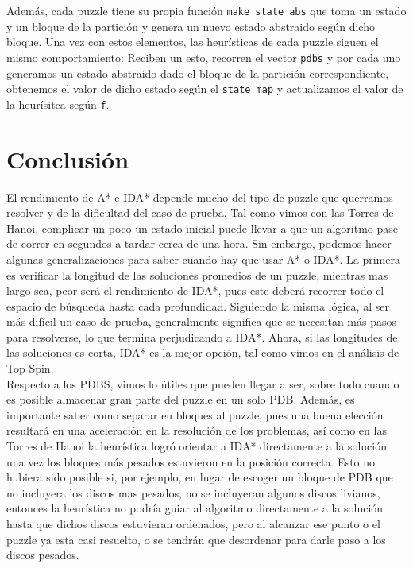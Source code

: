 \documentclass[a4paper,10pt]{article}
\begin{document}
    Adem\'as, cada puzzle tiene su propia funci\'on \verb|make_state_abs| que toma un 
    estado y un bloque de la partici\'on y genera un nuevo estado abstraido seg\'un 
    dicho bloque. Una vez con estos elementos, las heur\'isticas de cada puzzle siguen 
    el mismo comportamiento: Reciben un esto, recorren el vector \verb|pdbs| y por cada 
    uno generamos un estado abstraido dado el bloque de la partici\'on correspondiente, 
    obtenemos el valor de dicho estado seg\'un el \verb|state_map| y actualizamos el 
    valor de la heur\'isitca seg\'un \verb|f|. 
    
\newpage
\section{Conclusi\'on}
    El rendimiento de A* e IDA* depende mucho del tipo de puzzle que
    querramos resolver y de la dificultad del caso de prueba. Tal
    como vimos con las Torres de Hanoi, complicar un poco un estado
    inicial puede llevar a que un algoritmo pase de correr en 
    segundos a tardar cerca de una hora. Sin embargo, podemos hacer
    algunas generalizaciones para saber cuando hay que usar A* o IDA*. La primera es verificar la longitud de las soluciones
    promedios de un puzzle, mientras mas largo sea, peor ser\'a el
    rendimiento de IDA*, pues este deber\'a recorrer todo el espacio
    de b\'usqueda hasta cada profundidad. Siguiendo la misma 
    l\'ogica, al ser m\'as dif\'icil un caso de prueba, generalmente
    significa que se necesitan m\'as pasos para resolverse, lo
    que termina perjudicando a IDA*. Ahora, si las longitudes de las
    soluciones es corta, IDA* es la mejor opci\'on, tal como vimos
    en el an\'alisis de Top Spin. \\
    
    Respecto a los PDBS, vimos lo \'utiles que pueden llegar a ser,
    sobre todo cuando es posible almacenar gran parte del puzzle
    en un solo PDB. Adem\'as, es importante saber como separar 
    en bloques al puzzle, pues una buena elecci\'on resultar\'a
    en una aceleraci\'on en la resoluci\'on de los problemas, as\'i
    como en las Torres de Hanoi la heur\'istica logr\'o orientar
    a IDA* directamente a la soluci\'on una vez los bloques m\'as 
    pesados estuvieron en la posici\'on correcta. Esto no hubiera
    sido posible si, por ejemplo, en lugar de escoger un bloque 
    de PDB que no incluyera los discos mas pesados, no se 
    incluyeran algunos discos livianos, entonces la heur\'istica
    no podr\'ia guiar al algoritmo directamente a la soluci\'on
    hasta que dichos discos estuvieran ordenados, pero al alcanzar
    ese punto o el puzzle ya esta casi resuelto, o se tendr\'an
    que desordenar para darle paso a los discos pesados. \\
    
\end{document}

